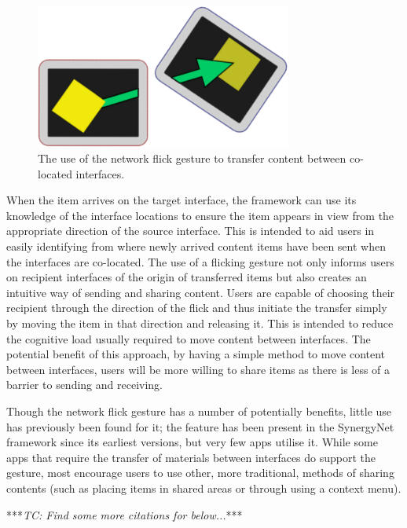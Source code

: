 \documentclass[a4paper,11pt]{article}
\begin{document}
\begin{figure}[h]
 \centering
   \includegraphics[width=0.75\textwidth]{figures/flickexample.png}
   \caption{The use of the network flick gesture to transfer content between co-located interfaces.}
   \label{fig:FlickExample}
\end{figure}

When the item arrives on the target interface, the framework can use its knowledge of the interface locations to ensure the item appears in view from the appropriate direction of the source interface.
This is intended to aid users in easily identifying from where newly arrived content items have been sent when the interfaces are co-located.
The use of a flicking gesture not only informs users on recipient interfaces of the origin of transferred items but also creates an intuitive way of sending and sharing content.
Users are capable of choosing their recipient through the direction of the flick and thus initiate the transfer simply by moving the item in that direction and releasing it.
This is intended to reduce the cognitive load usually required to move content between interfaces.
The potential benefit of this approach, by having a simple method to move content between interfaces, users will be more willing to share items as there is less of a barrier to sending and receiving.

Though the network flick gesture has a number of potentially benefits, little use has previously been found for it; the feature has been present in the SynergyNet framework since its earliest versions, but very few apps utilise it.
While some apps that require the transfer of materials between interfaces do support the gesture, most encourage users to use other, more traditional, methods of sharing contents (such as placing items in shared areas or through using a context menu).

***{\emph{TC: Find some more citations for below...}}***
\end{document}
